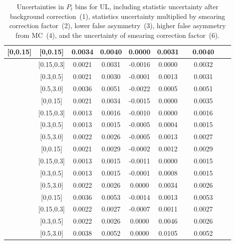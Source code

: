 \begin{table}[H]
\begin{tabular}{|c| c| c| c| c| c| c| c| c| c|}
[0,0.15]	&	[0,0.15]	&	0.0034	&	0.0040	&	0.0000	&	0.0031	&		&	0.0040	\\ \hline
[0,0.15]	&	[0.15,0.3]	&	0.0021	&	0.0031	&	-0.0016	&	0.0000	&		&	0.0032	\\ \hline
[0,0.15]	&	[0.3,0.5]	&	0.0021	&	0.0030	&	-0.0001	&	0.0013	&		&	0.0031	\\ \hline
[0,0.15]	&	[0.5,3.0]	&	0.0036	&	0.0051	&	-0.0022	&	0.0005	&		&	0.0051	\\ \hline
[0.15,0.3]	&	[0,0.15]	&	0.0021	&	0.0034	&	-0.0015	&	0.0000	&		&	0.0035	\\ \hline
[0.15,0.3]	&	[0.15,0.3]	&	0.0013	&	0.0016	&	-0.0010	&	0.0000	&		&	0.0016	\\ \hline
[0.15,0.3]	&	[0.3,0.5]	&	0.0013	&	0.0015	&	-0.0005	&	0.0004	&		&	0.0015	\\ \hline
[0.15,0.3]	&	[0.5,3.0]	&	0.0022	&	0.0026	&	-0.0005	&	0.0013	&		&	0.0027	\\ \hline
[0.3,0.5]	&	[0,0.15]	&	0.0021	&	0.0029	&	-0.0002	&	0.0012	&		&	0.0029	\\ \hline
[0.3,0.5]	&	[0.15,0.3]	&	0.0013	&	0.0015	&	-0.0011	&	0.0000	&		&	0.0015	\\ \hline
[0.3,0.5]	&	[0.3,0.5]	&	0.0013	&	0.0015	&	-0.0001	&	0.0008	&		&	0.0015	\\ \hline
[0.3,0.5]	&	[0.5,3.0]	&	0.0022	&	0.0026	&	0.0000	&	0.0034	&		&	0.0026	\\ \hline
[0.5,3.0]	&	[0,0.15]	&	0.0036	&	0.0053	&	-0.0014	&	0.0013	&		&	0.0053	\\ \hline
[0.5,3.0]	&	[0.15,0.3]	&	0.0022	&	0.0027	&	-0.0007	&	0.0011	&		&	0.0027	\\ \hline
[0.5,3.0]	&	[0.3,0.5]	&	0.0022	&	0.0026	&	0.0000	&	0.0046	&		&	0.0026	\\ \hline
[0.5,3.0]	&	[0.5,3.0]	&	0.0038	&	0.0052	&	0.0000	&	0.0105	&		&	0.0052	\\ \hline
\end{tabular}
\caption{Uncertainties in $P_t$ bins for UL, including statistic uncertainty after background correction~(1), statistics uncertainty multiplied by smearing correction factor~(2), lower false asymmetry~(3), higher false asymmetry from MC~(4),  and the uncertainty of smearing correction factor~(6).}
\label{tab:ulerrors_pt}
\end{table}

